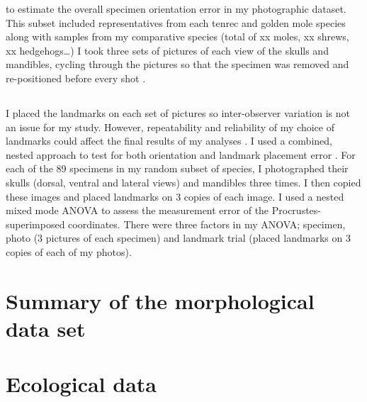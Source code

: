 to estimate the overall specimen orientation error in my photographic dataset. This subset included representatives from each tenrec and golden mole species along with samples from my comparative species (total of xx moles, xx shrews, xx hedgehogs…)  I took three sets of pictures of each view of the skulls and mandibles, cycling through the pictures so that the specimen was removed and re-positioned before every shot \citep{Viscosi2011}. 

\subsection{}

I placed the landmarks on each set of pictures so inter-observer variation is not an issue for my study.  However, repeatability and reliability of my choice of landmarks could affect the final results of my analyses \citep{Arnqvist}.
I used a combined, nested approach to test for both orientation and landmark placement error \citep{Arnqvist1998, Barrow2008}. For each of the 89 specimens in my random subset of species, I photographed their skulls (dorsal, ventral and lateral views) and mandibles three times. I then copied these images and placed landmarks on 3 copies of each image. I used a nested mixed mode ANOVA to assess the measurement error of the Procrustes-superimposed coordinates. There were three factors in my ANOVA; specimen, photo (3 pictures of each specimen) and landmark trial (placed landmarks on 3 copies of each of my photos).


\section{Summary of the morphological data set}

\section{Ecological data}


